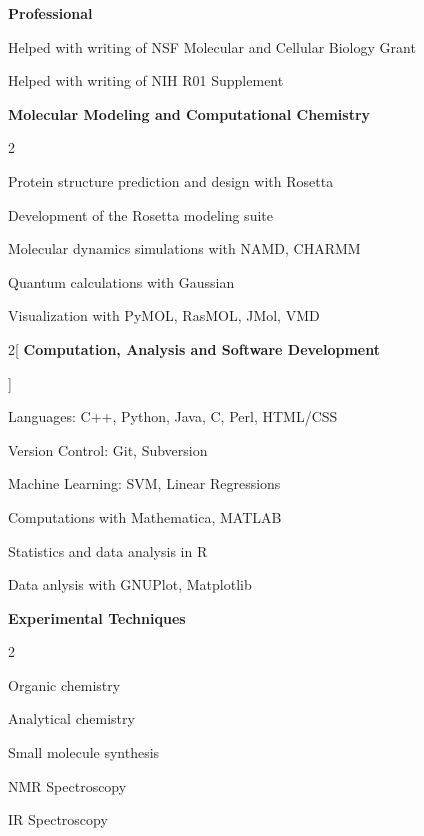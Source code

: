 \documentclass[12pt]{article}
\newcommand{\skillsitem}[1]{
\noindent 
\textbf{#1}\vspace{0.25\baselineskip}\par}
\begin{document}
\skillsitem{Professional}
\begin{compactitem}
\item Helped with writing of NSF Molecular and Cellular Biology Grant
\item Helped with writing of NIH R01 Supplement
\end{compactitem}

\skillsitem{Molecular Modeling and Computational Chemistry}
\begin{multicols}{2}
\begin{compactitem}
\item Protein structure prediction and design with Rosetta
\item Development of the Rosetta modeling suite 
\item Molecular dynamics simulations with NAMD, CHARMM
\item Quantum calculations with Gaussian
\item Visualization with PyMOL, RasMOL, JMol, VMD \\
\end{compactitem}
\end{multicols}

\begin{multicols}{2}[\skillsitem{Computation, Analysis and Software Development}]
\begin{compactitem}
\item Languages: C++, Python, Java, C, Perl, HTML/CSS
\item Version Control: Git, Subversion 
\item Machine Learning: SVM, Linear Regressions
\item Computations with Mathematica, MATLAB
\item Statistics and data analysis in R
\item Data anlysis with GNUPlot, Matplotlib \\
\end{compactitem} 
\end{multicols}

\skillsitem{Experimental Techniques} 
\begin{multicols}{2}
\begin{compactitem}
\item Organic chemistry
\item Analytical chemistry
\item Small molecule synthesis
\item NMR Spectroscopy
\item IR Spectroscopy

\end{compactitem}
\end{multicols}
\end{document}

